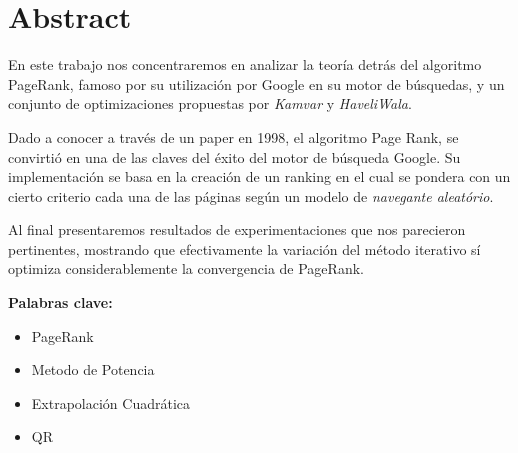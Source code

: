 \section{Abstract}

En este trabajo nos concentraremos en analizar la teoría detrás del algoritmo PageRank, famoso por su utilización por
Google en su motor de búsquedas, y un conjunto de optimizaciones propuestas por \textit{Kamvar} y \textit{HaveliWala}.

Dado a conocer a través de un paper en 1998, el algoritmo Page Rank, se convirtió en una de las claves del
éxito del motor de búsqueda Google. Su implementación se basa en la creación de un ranking en el cual se pondera
con un cierto criterio cada una de las páginas según un modelo de \textit{navegante aleatório}.

Al final presentaremos resultados de experimentaciones que nos parecieron pertinentes, mostrando que efectivamente
la variación del método iterativo sí optimiza considerablemente la convergencia de PageRank.

{\bf Palabras clave:}
\begin{itemize} 
    \item PageRank
    \item Metodo de Potencia
    \item Extrapolación Cuadrática
    \item QR
\end{itemize}
